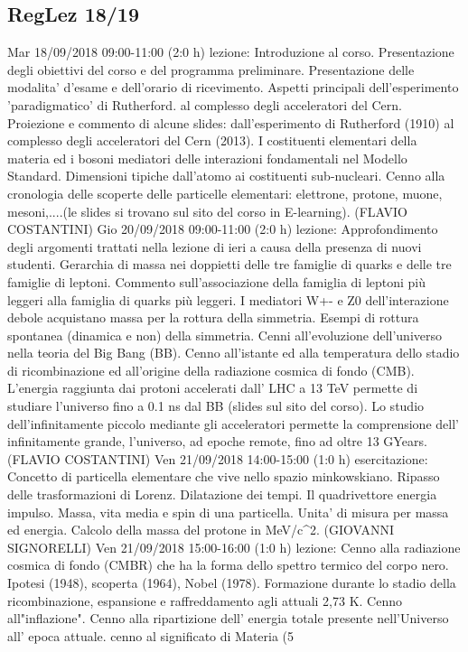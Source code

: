 \subsection{RegLez 18/19}
\begin{itemize}
     Mar 18/09/2018 09:00-11:00 (2:0 h) lezione: Introduzione al corso. Presentazione degli obiettivi del corso e del programma preliminare. Presentazione delle modalita' d'esame e dell'orario di ricevimento. Aspetti principali dell'esperimento 'paradigmatico' di Rutherford. al complesso degli acceleratori del Cern. Proiezione e commento di alcune slides: dall'esperimento di Rutherford (1910) al complesso degli acceleratori del Cern (2013). I costituenti elementari della materia ed i bosoni mediatori delle interazioni fondamentali nel Modello Standard. Dimensioni tipiche dall'atomo ai costituenti sub-nucleari. Cenno alla cronologia delle scoperte delle particelle elementari: elettrone, protone, muone, mesoni,....(le slides si trovano sul sito del corso in E-learning). (FLAVIO COSTANTINI)
Gio 20/09/2018 09:00-11:00 (2:0 h) lezione: Approfondimento degli argomenti trattati nella lezione di ieri a causa della presenza di nuovi studenti. Gerarchia di massa nei doppietti delle tre famiglie di quarks e delle tre famiglie di leptoni. Commento sull'associazione della famiglia di leptoni più leggeri alla famiglia di quarks più leggeri. I mediatori W+- e Z0 dell'interazione debole acquistano massa per la rottura della simmetria. Esempi di rottura spontanea (dinamica e non) della simmetria. Cenni all'evoluzione dell'universo nella teoria del Big Bang (BB). Cenno all'istante ed alla temperatura dello stadio di ricombinazione ed all'origine della radiazione cosmica di fondo (CMB). L'energia raggiunta dai protoni accelerati dall' LHC a 13 TeV permette di studiare l'universo fino a 0.1 ns dal BB (slides sul sito del corso). Lo studio dell'infinitamente piccolo mediante gli acceleratori permette la comprensione dell' infinitamente grande, l'universo, ad epoche remote, fino ad oltre 13 GYears. (FLAVIO COSTANTINI)
Ven 21/09/2018 14:00-15:00 (1:0 h) esercitazione: Concetto di particella elementare che vive nello spazio minkowskiano. Ripasso delle trasformazioni di Lorenz. Dilatazione dei tempi. Il quadrivettore energia impulso. Massa, vita media e spin di una particella. Unita’ di misura per massa ed energia. Calcolo della massa del protone in MeV/c^2. (GIOVANNI SIGNORELLI)
Ven 21/09/2018 15:00-16:00 (1:0 h) lezione: Cenno alla radiazione cosmica di fondo (CMBR) che ha la forma dello spettro termico del corpo nero. Ipotesi (1948), scoperta (1964), Nobel (1978). Formazione durante lo stadio della ricombinazione, espansione e raffreddamento agli attuali 2,73 K. Cenno all"inflazione". Cenno alla ripartizione dell' energia totale presente nell'Universo all' epoca attuale. cenno al significato di Materia (5%

\end{itemize}
